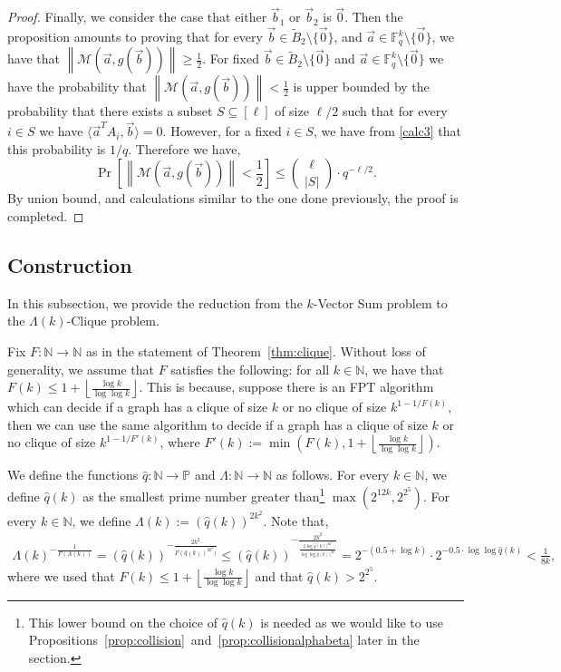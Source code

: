 \documentclass[10pt,a4paper]{article}
\newcommand{\F}{\mathbb{F}}
\renewcommand{\ge}{ \geqslant}
\renewcommand{\le}{ \leqslant}
\renewcommand{\tilde}{\widetilde}
\newcommand{\M}{\mathcal{M}}
\begin{document}
\begin{proof}
Finally, we consider the case that either $\vec{b}_1$ or $\vec{b}_2$ is $\vec{0}$. Then the proposition amounts to proving that  for every   $\vec{b}\in \tilde{B}_2\setminus\{\vec{0}\}$, and  $\vec{a}\in\F_q^k\setminus\{\vec{0}\}$, we  have that  $\left\|\M\left(\vec{a},g(\vec{b})\right)\right\|\ge \frac{1}{2}$. For fixed   $\vec{b}\in \tilde{B}_2\setminus\{\vec{0}\}$ and  $\vec{a}\in\F_q^k\setminus\{\vec{0}\}$ we have the probability that $\left\|\M\left(\vec{a},g(\vec{b})\right)\right\|< \frac{1}{2}$ is upper bounded by the probability that there exists a subset  $S\subseteq [\ell]$ of size    $\ell /2$ such  that for every $i\in S$ we have $\langle \vec{a}^T A_i, \vec{b}\rangle= 0$. However, for a fixed $i\in S$, we have from \eqref{calc3} that  this probability is $1/q$.
Therefore we have, 
$$\Pr\left[\left\|\M\left(\vec{a},g(\vec{b})\right)\right\|< \frac{1}{2}\right]\le \binom{\ell }{|S|}\cdot q^{-\ell/2}.$$
By union bound, and calculations similar to the one done previously, the proof is completed. 
\end{proof}



 
\subsection{Construction} \label{sec:construction}

In this subsection, we provide the reduction from the $k$-Vector Sum problem to the $\Lambda(k)$-Clique problem. 

Fix $F:\mathbb{N}\to\mathbb{N}$ as in the statement of Theorem~\ref{thm:clique}.
Without loss of generality, we assume that  $F$  satisfies the following:   for all $k\in\mathbb{N}$, we have that $F(k)\le 1+\left\lfloor \frac{\log k}{\log\log k}\right\rfloor$. This is because, suppose there is an FPT algorithm   which can decide if a graph has a clique of size $k$ or no clique of size $k^{1-1/F(k)}$, then we can use the same algorithm to decide if  a graph has a clique of size $k$ or no clique of size $k^{1-1/F'(k)}$, where $F'(k):=\min\left(F(k),1+\left\lfloor \frac{\log k}{\log\log k}\right\rfloor\right)$.

 We define the functions 
$\hat{q}:\mathbb{N}\to\mathbb{P}$ and $\Lambda:\mathbb{N}\to\mathbb{N}$ as follows. For every $k\in\mathbb{N}$, we define $\hat{q}(k)$ as the smallest prime number greater than\footnote{This lower bound on the choice of $\hat{q}(k)$ is needed as we would like to use Propositions~\ref{prop:collision}~and~\ref{prop:collisionalphabeta} later in the section.} $\max\left(2^{12k},2^{2^5}\right)$. For every $k\in\mathbb{N}$, we define $\Lambda(k):=(\hat{q}(k))^{2k^2}$. Note that, 
\begin{align}
	\Lambda(k)^{-\frac{1}{F(\Lambda(k))}}=(\hat{q}(k))^{ -\frac{2k^2}{F(\hat{q}(k))^{2k^2})}}\le (\hat{q}(k))^{ -\frac{2k^2}{\frac{2\log\hat{q}(k))^{2k^2}}{\log\log \hat{q}(k))^{2k^2}}}}= 2^{-(0.5+ \log k)}\cdot 2^{-0.5\cdot \log\log \hat{q}(k)}<  \frac{1}{8k},\label{eqF}
\end{align} 
where we used that  $F(k)\le 1+\left\lfloor \frac{\log k}{\log\log k}\right\rfloor$ and that $\hat{q}(k)>2^{2^5}$. 
 
\end{document}
